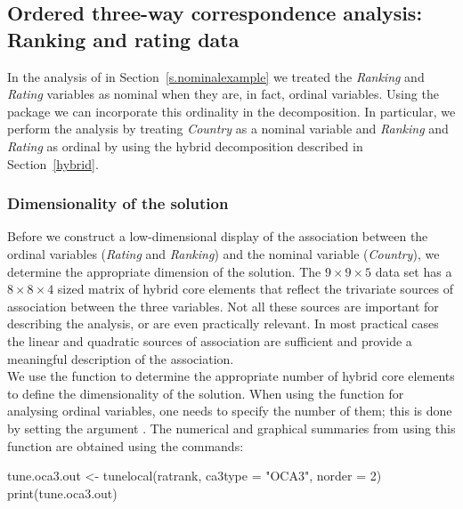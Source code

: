 \subsection{Ordered three-way correspondence analysis: Ranking and rating data}
\label{s.hybridexample}
In the analysis of  in Section~\ref{s.nominalexample} we treated the {\it Ranking} and {\it Rating} variables as nominal when they are, in fact, ordinal variables. Using the  package we can incorporate this ordinality in the decomposition. In particular, we perform the analysis by treating {\it Country} as a nominal variable and {\it Ranking} and {\it Rating} as ordinal by using the hybrid decomposition described in Section~\ref{hybrid}.

\subsubsection{Dimensionality of the solution}

Before we construct a low-dimensional display of the association between the ordinal variables ({\it Rating} and {\it Ranking}) and the nominal variable ({\it Country}), we determine the appropriate dimension of the solution. The $9\times 9 \times 5$ data set  has a $8\times 8\times 4$ sized matrix of hybrid core elements that reflect the trivariate sources of association between the three variables. Not all these sources are important for describing the analysis, or are even practically relevant. In most practical cases the linear and quadratic sources of association are sufficient and provide a meaningful description of the association. \\
We use the  function to determine the appropriate number of hybrid core elements to define the dimensionality of the solution. When using the  function for analysing ordinal variables, one needs to specify the number of them; this is done by setting  the argument . The numerical and graphical summaries from using this function are obtained using the commands:

\begin{example}
tune.oca3.out <- tunelocal(ratrank, ca3type = "OCA3", norder = 2)
print(tune.oca3.out)
\end{example}

